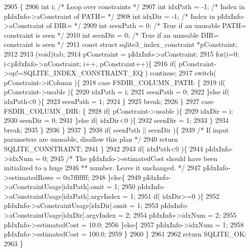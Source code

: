 \begin{DoxyCode}
2905  \{
2906   \textcolor{keywordtype}{int} i;                 \textcolor{comment}{/* Loop over constraints */}
2907   \textcolor{keywordtype}{int} idxPath = -1;      \textcolor{comment}{/* Index in pIdxInfo->aConstraint of PATH= */}
2908   \textcolor{keywordtype}{int} idxDir = -1;       \textcolor{comment}{/* Index in pIdxInfo->aConstraint of DIR= */}
2909   \textcolor{keywordtype}{int} seenPath = 0;      \textcolor{comment}{/* True if an unusable PATH= constraint is seen */}
2910   \textcolor{keywordtype}{int} seenDir = 0;       \textcolor{comment}{/* True if an unusable DIR= constraint is seen */}
2911   \textcolor{keyword}{const} \textcolor{keyword}{struct }sqlite3\_index\_constraint *pConstraint;
2912 
2913   (void)tab;
2914   pConstraint = pIdxInfo->aConstraint;
2915   \textcolor{keywordflow}{for}(i=0; i<pIdxInfo->nConstraint; i++, pConstraint++)\{
2916     \textcolor{keywordflow}{if}( pConstraint->op!=SQLITE_INDEX_CONSTRAINT_EQ ) \textcolor{keywordflow}{continue};
2917     \textcolor{keywordflow}{switch}( pConstraint->iColumn )\{
2918       \textcolor{keywordflow}{case} FSDIR_COLUMN_PATH: \{
2919         \textcolor{keywordflow}{if}( pConstraint->usable )\{
2920           idxPath = i;
2921           seenPath = 0;
2922         \}\textcolor{keywordflow}{else} \textcolor{keywordflow}{if}( idxPath<0 )\{
2923           seenPath = 1;
2924         \}
2925         \textcolor{keywordflow}{break};
2926       \}
2927       \textcolor{keywordflow}{case} FSDIR_COLUMN_DIR: \{
2928         \textcolor{keywordflow}{if}( pConstraint->usable )\{
2929           idxDir = i;
2930           seenDir = 0;
2931         \}\textcolor{keywordflow}{else} \textcolor{keywordflow}{if}( idxDir<0 )\{
2932           seenDir = 1;
2933         \}
2934         \textcolor{keywordflow}{break};
2935       \}
2936     \} 
2937   \}
2938   \textcolor{keywordflow}{if}( seenPath || seenDir )\{
2939     \textcolor{comment}{/* If input parameters are unusable, disallow this plan */}
2940     \textcolor{keywordflow}{return} SQLITE_CONSTRAINT;
2941   \}
2942 
2943   \textcolor{keywordflow}{if}( idxPath<0 )\{
2944     pIdxInfo->idxNum = 0;
2945     \textcolor{comment}{/* The pIdxInfo->estimatedCost should have been initialized to a huge}
2946 \textcolor{comment}{    ** number.  Leave it unchanged. */}
2947     pIdxInfo->estimatedRows = 0x7fffffff;
2948   \}\textcolor{keywordflow}{else}\{
2949     pIdxInfo->aConstraintUsage[idxPath].omit = 1;
2950     pIdxInfo->aConstraintUsage[idxPath].argvIndex = 1;
2951     \textcolor{keywordflow}{if}( idxDir>=0 )\{
2952       pIdxInfo->aConstraintUsage[idxDir].omit = 1;
2953       pIdxInfo->aConstraintUsage[idxDir].argvIndex = 2;
2954       pIdxInfo->idxNum = 2;
2955       pIdxInfo->estimatedCost = 10.0;
2956     \}\textcolor{keywordflow}{else}\{
2957       pIdxInfo->idxNum = 1;
2958       pIdxInfo->estimatedCost = 100.0;
2959     \}
2960   \}
2961 
2962   \textcolor{keywordflow}{return} SQLITE_OK;
2963 \}
\end{DoxyCode}
\mbox{\label{shell_8c_ac8c0b7b47369b8c3193edd370b0c2f60}} 
